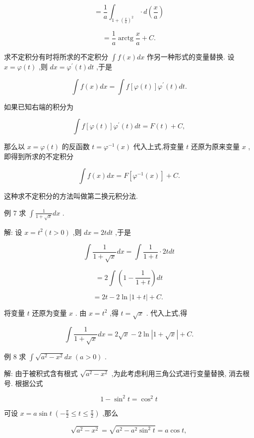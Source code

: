 \documentclass[10pt]{article}
\begin{document}
\[
= \frac{1}{a}{\int }_{1 + {\left( \frac{x}{a}\right) }^{2}} \cdot d\left( \frac{x}{a}\right)
\]

\[
= \frac{1}{a}\operatorname{arctg}\frac{x}{a} + C.
\]

求不定积分有时将所求的不定积分 \(\int f\left( x\right) {dx}\) 作另一种形式的变量替换. 设 \(x = \varphi \left( t\right)\) ,则 \({dx} = {\varphi }^{\prime }\left( t\right) {dt}\) ,于是

\[
\int f\left( x\right) {dx} = \int f\left\lbrack {\varphi \left( t\right) }\right\rbrack {\varphi }^{\prime }\left( t\right) {dt}.
\]

如果已知右端的积分为

\[
\int f\left\lbrack {\varphi \left( t\right) }\right\rbrack {\varphi }^{\prime }\left( t\right) {dt} = F\left( t\right) + C,
\]

那么以 \(x = \varphi \left( t\right)\) 的反函数 \(t = {\varphi }^{-1}\left( x\right)\) 代入上式,将变量 \(t\) 还原为原来变量 \(x\) ,即得到所求的不定积分

\[
\int f\left( x\right) {dx} = F\left\lbrack {{\varphi }^{-1}\left( x\right) }\right\rbrack + C.
\]

这种求不定积分的方法叫做第二换元积分法.

例 7 求 \(\int \frac{1}{1 + \sqrt{x}}{dx}\) .

解: 设 \(x = {t}^{2}\left( {t > 0}\right)\) ,则 \({dx} = {2tdt}\) ,于是

\[
\int \frac{1}{1 + \sqrt{x}}{dx} = \int \frac{1}{1 + t} \cdot {2tdt}
\]

\[
= 2\int \left( {1 - \frac{1}{1 + t}}\right) {dt}
\]

\[
= {2t} - 2\ln \left| {1 + t}\right| + C\text{. }
\]

将变量 \(t\) 还原为变量 \(x\) . 由 \(x = {t}^{2}\) ,得 \(t = \sqrt{x}\) . 代入上式,得

\[
\int \frac{1}{1 + \sqrt{x}}{dx} = 2\sqrt{x} - 2\ln \left| {1 + \sqrt{x}}\right| + C.
\]

例 8 求 \(\int \sqrt{{a}^{2} - {x}^{2}}{dx}\;\left( {a > 0}\right)\) .

解: 由于被积式含有根式 \(\sqrt{{a}^{2} - {x}^{2}}\) ,为此考虑利用三角公式进行变量替换, 消去根号. 根据公式

\[
1 - {\sin }^{2}t = {\cos }^{2}t
\]

可设 \(x = a\sin t\;\left( {-\frac{\pi }{2} \leq t \leq \frac{\pi }{2}}\right)\) ,那么

\[
\sqrt{{a}^{2} - {x}^{2}} = \sqrt{{a}^{2} - {a}^{2}{\sin }^{2}t} = a\cos t,
\]
\end{document}
